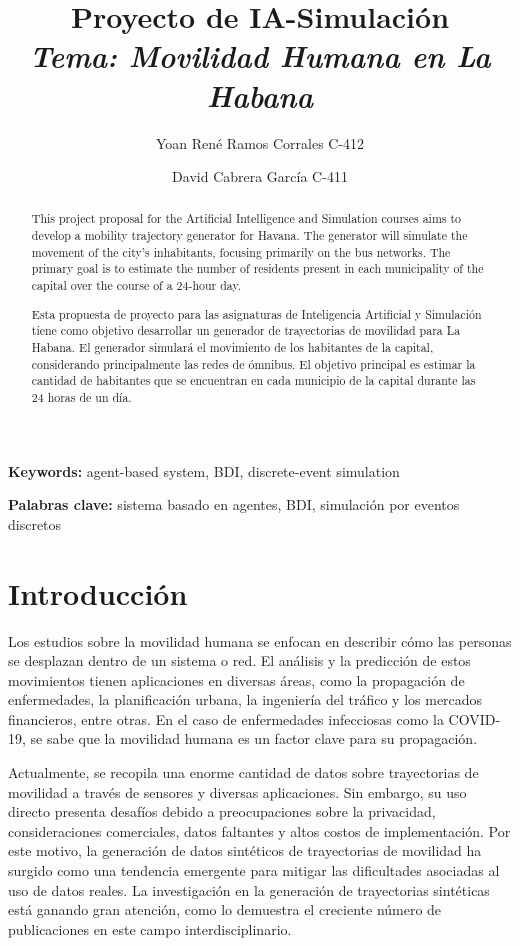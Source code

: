 \documentclass[a4paper,12pt]{article}
\title{Proyecto de IA-Simulaci\'on\\\textit{Tema: Movilidad Humana en La Habana}}
\author{Yoan Ren\'e Ramos Corrales  C-412  \and  David Cabrera Garc\'ia  C-411}
\begin{document}
\maketitle

\renewcommand{\abstractname}{Abstract}
\begin{abstract}
This project proposal for the Artificial Intelligence and Simulation courses aims to develop a mobility trajectory generator for Havana. The generator will simulate the movement of the city's inhabitants, focusing primarily on the bus networks. The primary goal is to estimate the number of residents present in each municipality of the capital over the course of a 24-hour day.

\end{abstract}
\textbf{Keywords:} agent-based system, BDI, discrete-event simulation
\renewcommand{\abstractname}{Resumen}
\begin{abstract}
Esta propuesta de proyecto para las asignaturas de Inteligencia Artificial y Simulación tiene como objetivo desarrollar un generador de trayectorias de movilidad para La Habana. El generador simulará el movimiento de los habitantes de la capital, considerando principalmente las redes de ómnibus. El objetivo principal es estimar la cantidad de habitantes que se encuentran en cada municipio de la capital durante las 24 horas de un día.
\end{abstract}
\textbf{Palabras clave:} sistema basado en agentes, BDI, simulación por eventos discretos

\newpage
\tableofcontents
\newpage
\section{Introducción}
Los estudios sobre la movilidad humana se enfocan en describir cómo las personas se desplazan dentro de un sistema o red. El análisis y la predicción de estos movimientos tienen aplicaciones en diversas áreas, como la propagación de enfermedades, la planificación urbana, la ingeniería del tráfico y los mercados financieros, entre otras. En el caso de enfermedades infecciosas como la COVID-19, se sabe que la movilidad humana es un factor clave para su propagación.

Actualmente, se recopila una enorme cantidad de datos sobre trayectorias de movilidad a través de sensores y diversas aplicaciones. Sin embargo, su uso directo presenta desafíos debido a preocupaciones sobre la privacidad, consideraciones comerciales, datos faltantes y altos costos de implementación. Por este motivo, la generación de datos sintéticos de trayectorias de movilidad ha surgido como una tendencia emergente para mitigar las dificultades asociadas al uso de datos reales. La investigación en la generación de trayectorias sintéticas está ganando gran atención, como lo demuestra el creciente número de publicaciones en este campo interdisciplinario.
\end{document}
